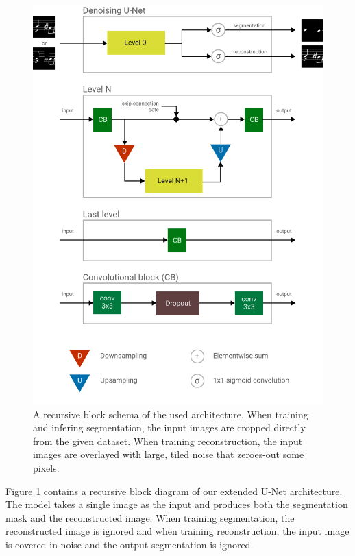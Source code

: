 \begin{figure}[p]
    \centering
    \includegraphics[width=145mm]{../img/architecture-pieces.pdf}
    \caption{A recursive block schema of the used architecture. When training and infering segmentation, the input images are cropped directly from the given dataset. When training reconstruction, the input images are overlayed with large, tiled noise that zeroes-out some pixels.}
    \label{fig:ArchitecturePieces}
\end{figure}

Figure \ref{fig:ArchitecturePieces} contains a recursive block diagram of our extended U-Net architecture. The model takes a single image as the input and produces both the segmentation mask and the reconstructed image. When training segmentation, the reconstructed image is ignored and when training reconstruction, the input image is covered in noise and the output segmentation is ignored.


